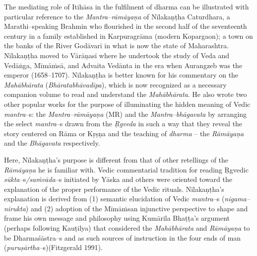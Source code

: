 The mediating role of Itihāsa in the fulfilment of dharma can be illustrated with particular reference to the \textit{Mantra–rāmāyaṇa} of Nīlakaṇṭha Caturdhara, a Marathi–speaking Brahmin who flourished in the second half of the seventeenth century in a family established in Karpuragrāma (modern Kopargaon); a town on the banks of the River Godāvarī in what is now the state of Maharashtra. Nīlakaṇṭha moved to Vārāṇasī where he undertook the study of Veda and Vedāṅga, Mīmāṁsā, and Advaita Vedānta in the era when Aurangzeb was the emperor (1658–1707). Nīlakaṇṭha is better known for his commentary on the \textit{Mahābhārata} (\textit{Bhāratabhāvadīpa}), which is now recognized as a necessary companion volume to read and understand the \textit{Mahābhārata}. He also wrote two other popular works for the purpose of illuminating the hidden meaning of Vedic \textit{mantra}–s: the \textit{Mantra–rāmāyaṇa} (MR) and the \textit{Mantra–bhāgavata} by arranging the select \textit{mantra}–s drawn from the \textit{Ṛgveda} in such a way that they reveal the story centered on Rāma or Kṛṣṇa and the teaching of \textit{dharma} – the \textit{Rāmāyaṇa} and the \textit{Bhāgavata} respectively.

Here, Nīlakaṇṭha’s purpose is different from that of other retellings of the \textit{Rāmāyaṇa} he is familiar with. Vedic commentarial tradition for reading Ṛgvedic \textit{sūkta–}s\textit{/saṁvāda–}s initiated by Yāska and others were oriented toward the explanation of the proper performance of the Vedic rituals. Nīlakaṇṭha's explanation is derived from (1) semantic elucidation of Vedic \textit{mantra}–s (\textit{nigama–nirukta}) and (2) adoption of the Mīmāṁsan injunctive perspective to shape and frame his own message and philosophy using Kumārila Bhaṭṭa’s argument (perhaps following Kauṭilya) that considered the \textit{Mahābhārata} and \textit{Rāmāyaṇa} to be Dharmaśāstra–s and as such sources of instruction in the four ends of man (\textit{puruṣārtha–}s)(Fitzgerald 1991).

